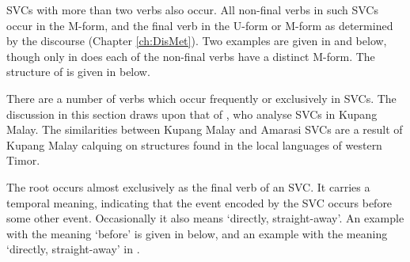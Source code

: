 SVCs with more than two verbs also occur.
All non-final verbs in such SVCs occur in the M-form,
and the final verb in the U-form or M-form as determined by the discourse (Chapter \ref{ch:DisMet}).
Two examples are given in  and  below,
though only in  does each of the non-final verbs have a distinct M-form.
The structure of  is given in  below.

\begin{exe}
	\label{ex:130825-6, 16.55}
	\label{ex:130925-1, 1.30}
	\label{tr:130925-1, 1.30}
\end{exe}

There are a number of verbs which occur frequently or exclusively in SVCs.
The discussion in this section draws upon that of \cite{jagr11}, who analyse SVCs in Kupang Malay.
The similarities between Kupang Malay and Amarasi SVCs are a result of 
Kupang Malay calquing on structures found in the local languages of western Timor.

The root  occurs almost exclusively as the final verb of an SVC.
It carries a temporal meaning, indicating that the event encoded by
the SVC occurs before some other event.
Occasionally it also means `directly, straight-away'.
An example with the meaning `before' is given in
 below,
and an example with the meaning `directly, straight-away' in .

